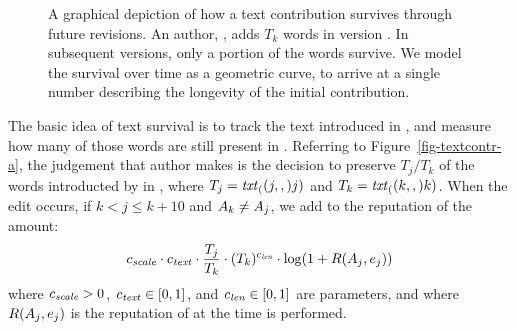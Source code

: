 


\begin{figure}[t]
\centering
{}
\hspace{1ex}
\caption{A graphical depiction of how a text contribution survives
	through future revisions.
	An author, , adds $T_k$ words in version .
	In subsequent versions, only a portion of the words survive.
	We model the survival over time as a geometric curve,
	to arrive at a single number describing the longevity
	of the initial contribution.}
\label{fig-textsurvival}
\end{figure}


  The basic idea of text survival is to track the text introduced in
  , and measure how many of those words are
  still present in .
  Referring to Figure~\ref{fig-textcontr-a}, the judgement
  that author  makes is the
  decision to preserve $T_j / T_k$ of the words introducted
  by  in , where
  $T_j = \mathit{txt}_{(}(j,,)j)$ and $T_k = \mathit{txt}_{(}(k,,)k)$.
  When the edit  occurs, if
  $k < j \leq k+10$ and $A_{k} \neq A_{j}$,
  we add to the reputation
  of  the amount:
  \[
    {c_{{\text{\textit{scale}}}}} \cdot {c_{{\text{\textit{text}}}}} \cdot \frac{T_j}{T_k}
    \cdot (T_k)^{c_{{\text{\textit{len}}}}} \cdot \log(1 + R(A_{j},e_{j}))
  \]
  where ${c_{{\text{\textit{scale}}}}} > 0$, ${c_{{\text{\textit{text}}}}} \in [0,1]$, and ${c_{{\text{\textit{len}}}}} \in
  [0,1]$ are parameters, and where $R(A_{j},e_{j})$
  is the reputation of  at the time  is performed.


